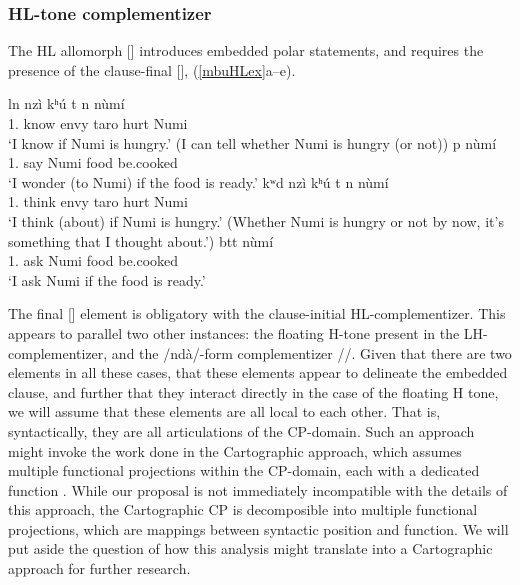 \documentclass[output=paper,colorlinks,citecolor=brown]{langscibook}
\begin{document}
\subsubsection{HL-tone complementizer} \label{secHL}

The HL allomorph [\mbuHL] introduces embedded polar statements, and requires the presence of the clause-final [\la], (\ref{mbuHLex}a--e).

\ea \label{mbuHLex}
    \begin{xlist}
    \ex \label{mbuHLexa}
         {l\epH n} {\mbuHL} {nzì} {kʰ{ú}} {\epL\epH t} {n\dz\epH} {n{ù}m{í}} {\ds\la} \\
             {1.} {know} {} {envy} {taro} {} {hurt} {Numi} {} \\
        \glt `I know if Numi is hungry.' (I can tell whether Numi is hungry (or not))
    \ex \label{mbuHLexb}
         {p} {n{ù}m{í}} {\mbuHL} {\ch\schwaL{}} {\ds\textscb\schwaH} {\ds\la}\\
             {1.} {say} {Numi} {} {food} {be.cooked} {}\\
        \glt `I wonder (to Numi) if the food is ready.'
    \ex \label{mbuHLexc}
         {kʷ\epL d\schwaL} {\mbuL} {nzì} {kʰ{ú}} {\epL\epH t} {n\dz\epH} {n{ù}m{í}} {\ds\la} \\
             {1.} {think} {} {envy} {taro} {} {hurt} {Numi} {} \\
        \glt `I think (about) if Numi is hungry.' (Whether Numi is hungry or not by now, it's something that I thought about.')
    \ex \label{mbuHLexd}
         {b\epH tt\schwaH} {n{ù}m{í}} {\mbuL} {\ch\schwaL{}} {\ds\textscb\schwaH} {\ds\la} \\
             {1.} {ask} {Numi} {} {food} {be.cooked} {} \\
        \glt `I ask Numi if the food is ready.'
    \end{xlist}
\z

The final [\la] element is obligatory with the clause-initial HL-complementizer. This appears to parallel two other instances: the floating H-tone present in the LH-complementizer, and the /nd{à}/-form complementizer /\la/. Given that there are two elements in all these cases, that these elements appear to delineate the embedded clause, and further that they interact directly in the case of the floating H tone, we will assume that these elements are all local to each other. That is, syntactically, they are all articulations of the CP-domain. Such an approach might invoke the work done in the Cartographic approach, which assumes multiple functional projections within the CP-domain, each with a dedicated function \citep{Rizzi1997}. While our proposal is not immediately incompatible with the details of this approach, the Cartographic CP is decomposible into multiple functional projections, which are mappings between syntactic position and function. We will put aside the question of how this analysis might translate into a Cartographic approach for further research.
\end{document}
